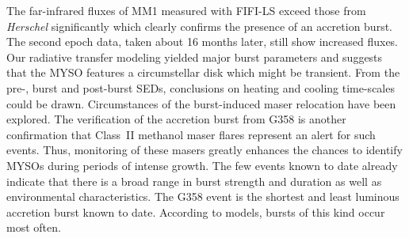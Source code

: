    {
   The far-infrared fluxes of MM1 measured with FIFI-LS exceed those from %
   {\em Herschel} significantly which clearly confirms the presence of an accretion burst. The second epoch data, taken 
   about 16 months later, still show increased fluxes. Our radiative transfer modeling yielded major burst parameters and suggests that the MYSO
   features a circumstellar disk which might be transient.
   From the pre-, burst and post-burst SEDs, conclusions on heating and cooling time-scales could be drawn. Circumstances of the burst-induced maser relocation have been explored.
   }
   {
   The verification of the accretion burst from G358 is another confirmation that Class~II methanol maser flares represent an alert for such events. Thus, monitoring of these masers greatly enhances the chances to identify MYSOs during periods of intense growth. 
   The few events known to date already indicate that there is a broad range in burst strength and duration as well as environmental characteristics. The G358 event is the shortest and least luminous  accretion burst known to date. According to models, bursts of this kind occur most often.
   }


   \maketitle
%

